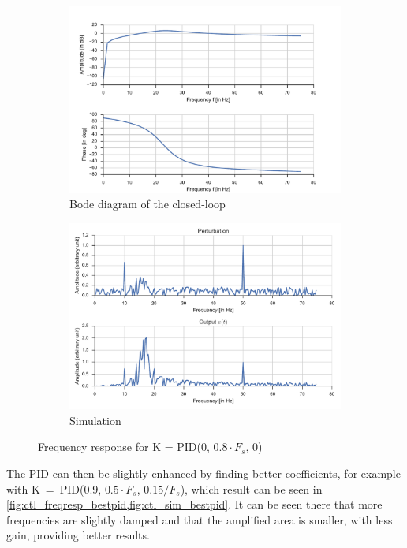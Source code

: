 \begin{figure}
    \centering
    \begin{subfigure}{0.49\textwidth}
        \includegraphics[width=\textwidth]{img/ctl_freqresp_pid}
        \caption{\label{fig:ctl_freqresp_pid} Bode diagram of the closed-loop}
    \end{subfigure}
    \hfill
    \begin{subfigure}{0.49\textwidth}
        \includegraphics[width=\textwidth]{img/ctl_sim_pid}
        \caption{\label{fig:ctl_sim_pid}Simulation}
        \end{subfigure}    
    \caption{Frequency response for K = PID(0, $0.8\cdot F_s$, 0)}
\end{figure}

The PID can then be slightly enhanced by finding better coefficients, for example with K~=~PID($0.9$, $0.5\cdot F_s$, $0.15/F_s$), which result can be seen in \cref{fig:ctl_freqresp_bestpid,fig:ctl_sim_bestpid}. It can be seen there that more frequencies are slightly damped and that the amplified area is smaller, with less gain, providing better results.

